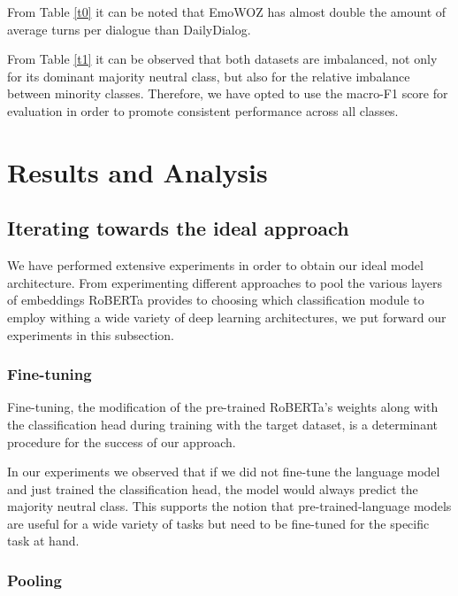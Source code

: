 \documentclass[11pt]{article}
\begin{document}
From Table  \ref{t0} it can be noted that EmoWOZ has almost double the amount of average turns per dialogue than DailyDialog. 

From Table \ref{t1} it can be observed that both datasets are imbalanced, not only for its dominant majority neutral class, but also for the relative imbalance between minority classes. Therefore, we have opted to use the macro-F1 score for evaluation in order to promote consistent performance across all classes.





\section{Results and Analysis}


\subsection{Iterating towards the ideal approach}


We have performed extensive experiments in order to obtain our ideal model architecture. From experimenting different approaches to pool the various layers of embeddings RoBERTa provides to choosing which classification module to employ withing a wide variety of deep learning architectures, we put forward our experiments in this subsection.

\vspace{2.5mm}
\subsubsection{Fine-tuning}

Fine-tuning, the modification of the pre-trained RoBERTa's weights along with the classification head during training with the target dataset, is a determinant procedure for the success of our approach. 

In our experiments we observed that if we did not fine-tune the language model and just trained the classification head, the model would always predict the majority neutral class.
This supports the notion that pre-trained-language models are useful for a wide variety of tasks but need to be fine-tuned for the specific task at hand.
\vspace{2.5mm}
\subsubsection{Pooling}
\end{document}
